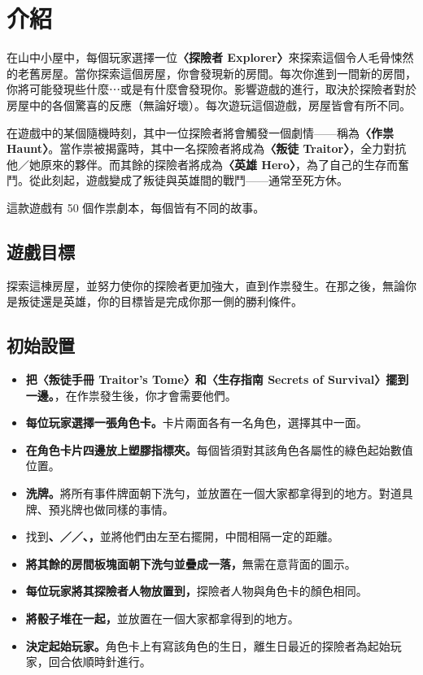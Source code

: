 
\section{介紹} \label{sec:intro}

在山中小屋中，每個玩家選擇一位\textbf{〈探險者 Explorer〉}來探索這個令人毛骨悚然的老舊房屋。當你探索這個房屋，你會發現新的房間。每次你進到一間新的房間，你將可能發現些什麼⋯或是有什麼會發現你。影響遊戲的進行，取決於探險者對於房屋中的各個驚喜的反應（無論好壞）。每次遊玩這個遊戲，房屋皆會有所不同。

在遊戲中的某個隨機時刻，其中一位探險者將會觸發一個劇情——稱為\textbf{〈作祟 Haunt〉}。當作祟被揭露時，其中一名探險者將成為\textbf{〈叛徒 Traitor〉}，全力對抗他／她原來的夥伴。而其餘的探險者將成為\textbf{〈英雄 Hero〉}，為了自己的生存而奮鬥。從此刻起，遊戲變成了叛徒與英雄間的戰鬥——通常至死方休。

這款遊戲有 50 個作祟劇本，每個皆有不同的故事。


\subsection{遊戲目標}

探索這棟房屋，並努力使你的探險者更加強大，直到作祟發生。在那之後，無論你是叛徒還是英雄，你的目標皆是完成你那一側的勝利條件。


\subsection{初始設置}

\begin{itemize}
  \item \textbf{把〈叛徒手冊 Traitor’s Tome〉和〈生存指南 Secrets of Survival〉擺到一邊。}，在作祟發生後，你才會需要他們。
  \item \textbf{每位玩家選擇一張角色卡。}卡片兩面各有一名角色，選擇其中一面。
  \item \textbf{在角色卡片四邊放上塑膠指標夾。}每個皆須對其該角色各屬性的綠色起始數值位置。
  \item \textbf{洗牌。}將所有事件牌面朝下洗勻，並放置在一個大家都拿得到的地方。對道具牌、預兆牌也做同樣的事情。
  \item 找到\textbf{、／／、，}並將他們由左至右擺開，中間相隔一定的距離。
  \item \textbf{將其餘的房間板塊面朝下洗勻並疊成一落，}無需在意背面的圖示。
  \item \textbf{每位玩家將其探險者人物放置到，}探險者人物與角色卡的顏色相同。
  \item \textbf{將骰子堆在一起，}並放置在一個大家都拿得到的地方。
  \item \textbf{決定起始玩家。}角色卡上有寫該角色的生日，離生日最近的探險者為起始玩家，回合依順時針進行。
\end{itemize}
